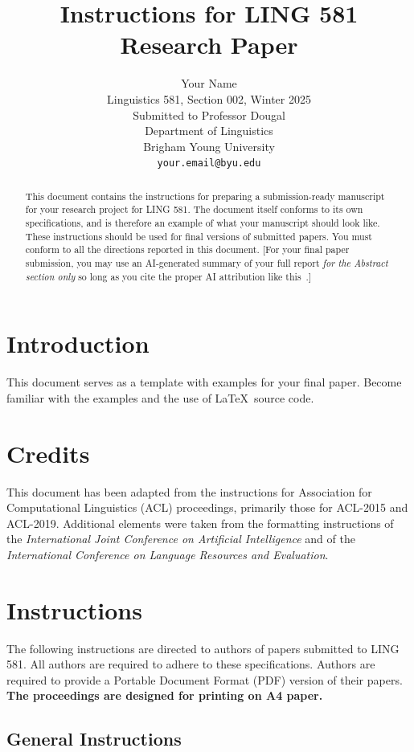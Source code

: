 \documentclass[11pt,table,xcdraw]{article}
\title{Instructions for LING 581 Research Paper}
\author{Your Name \\
  Linguistics 581, Section 002, Winter 2025 \\
  Submitted to Professor Dougal \\
  Department of Linguistics \\
  Brigham Young University \\
  {\tt your.email@byu.edu} }
\date{}
\begin{document}
\maketitle

\begin{abstract}
This document contains the instructions for preparing a submission-ready manuscript for your research project for LING 581. The document itself conforms to its own specifications, and is therefore an example of what your manuscript should look like. These instructions should be used for final versions of submitted papers. You must conform to all the directions reported in this document. [For your final paper submission, you may use an AI-generated summary of your full report \textit{for the Abstract section only} so long as you cite the proper AI attribution like this~\cite{chatgpt}.]
\end{abstract}


\section{Introduction}

This document serves as a template with examples for your final paper. Become familiar with the examples and the use of \LaTeX\ source code.

\section{Credits}

This document has been adapted from the instructions for Association for Computational Linguistics (ACL) proceedings, primarily those for ACL-2015 and ACL-2019. Additional elements were taken from the formatting instructions of the {\em International Joint Conference on Artificial Intelligence} and of the {\em International Conference on Language Resources and Evaluation}.

\section{Instructions}

The following instructions are directed to authors of papers submitted to LING 581. All authors are required to adhere to these specifications. Authors are required to provide a Portable Document Format (PDF) version of their papers. \textbf{The proceedings are designed for printing on A4 paper.}


\subsection{General Instructions} 
\end{document}
